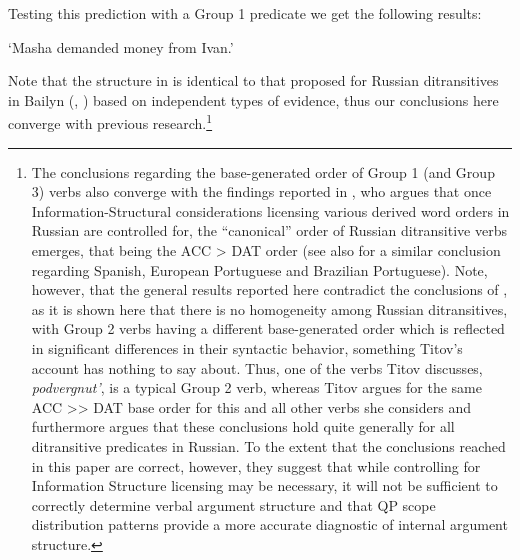 \documentclass[output=paper,colorlinks,citecolor=brown,modfonts,nonflat]{langsci/langscibook}
\begin{document}
Testing this prediction with a Group 1 predicate we get the following results:

\ea%
    \label{ex:antonyuk:48}
    \glt    `Masha demanded money from Ivan.'
    \z
\z


Note that the structure in  is identical to that proposed for Russian ditransitives in Bailyn (\citeyear{Bailyn1995}, \citeyear{Bailyn2012}) based on independent types of evidence, thus our conclusions here converge with previous research.\footnote{The conclusions regarding the base-generated order of Group 1 (and Group 3) verbs also converge with the findings reported in \citet{Titov2017}, who argues that once Information-Structural considerations licensing various derived word orders in Russian are controlled for, the “canonical” order of Russian ditransitive verbs emerges, that being the ACC > DAT order (see also  for a similar conclusion regarding Spanish, European Portuguese and Brazilian Portuguese). Note, however, that the general results reported here contradict the conclusions of \citet{Titov2017}, as it is shown here that there is no homogeneity among Russian ditransitives, with Group 2 verbs having a different base-generated order which is reflected in significant differences in their syntactic behavior, something Titov’s account has nothing to say about. Thus, one of the verbs Titov discusses, \textit{podvergnut’}, is a typical Group 2 verb, whereas Titov argues for the same ACC >> DAT base order for this and all other verbs she considers and furthermore argues that these conclusions hold quite generally for all ditransitive predicates in Russian. To the extent that the conclusions reached in this paper are correct, however, they suggest that while controlling for Information Structure licensing may be necessary, it will not be sufficient to correctly determine verbal argument structure and that QP scope distribution patterns provide a more accurate diagnostic of internal argument structure.}
\end{document}
